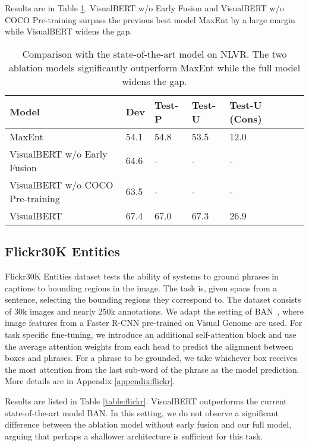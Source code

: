 \documentclass{article} \usepackage{iclr2019_conference,times}
\newcommand{\model}{VisualBERT\xspace}
\newcommand{\nlvr}{NLVR\xspace}
\newcommand{\modelnp}{VisualBERT w/o COCO Pre-training\xspace}
\newcommand{\modelby}{VisualBERT w/o Early Fusion\xspace}
\newcommand{\modelp}{VisualBERT\xspace}
\begin{document}
Results are in Table \ref{nlvr}. \modelby and \modelnp surpass the previous best model MaxEnt by a large margin while \modelp widens the gap.

\begin{table}[h]
\small
\begin{tabular}{l|llllll}
    \toprule
    Model  & Dev & Test-P & Test-U & Test-U (Cons)\\ 
    \midrule 

    MaxEnt \citep{suhr2018corpus} & 54.1 & 54.8 & 53.5 & 12.0 \\
    
    \midrule
    \modelby & 64.6 & - & - & - \\
    
    \modelnp & 63.5  & - & - & - \\

    \modelp & 67.4 & 67.0 & 67.3 & 26.9\\
    
    \bottomrule
    \end{tabular}
\caption{Comparison with the state-of-the-art model on \nlvr. The two ablation models significantly outperform MaxEnt while the full model widens the gap. } \label{nlvr}
\end{table}
\subsection{Flickr30K Entities}


Flickr30K Entities dataset tests the ability of systems to ground phrases in captions to bounding regions in the image. The task is, given spans from a sentence, selecting the bounding regions they correspond to. The dataset consists of 30k images and nearly 250k annotations. We adapt the setting of BAN~\citep{kim2018bilinear}, where image features from a Faster R-CNN pre-trained on Visual Genome are used.
For task specific fine-tuning, we introduce an additional self-attention block and use the average attention weights from each head to predict the alignment between boxes and phrases. For a phrase to be grounded, we take whichever box receives the most attention from the last sub-word of the phrase as the model prediction. More details are in Appendix \ref{appendix:flickr}.

Results are listed in Table \ref{table:flickr}.
\model outperforms the current state-of-the-art model BAN.
In this setting, we do not observe a significant difference between the ablation model without early fusion and our full model, arguing that perhaps a shallower architecture is sufficient for this task.
\end{document}
